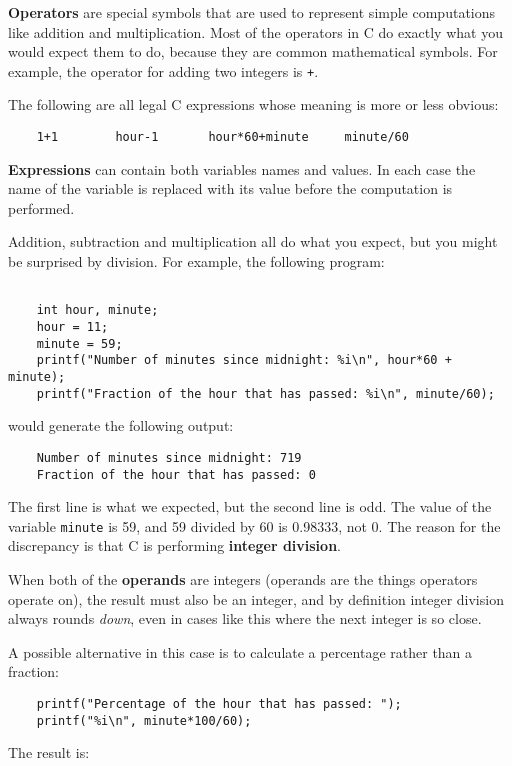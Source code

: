{\bf Operators} are special symbols that are used to represent
simple computations like addition and multiplication.  Most
of the operators in C do exactly what you would expect them
to do, because they are common mathematical symbols.  For
example, the operator for adding two integers is {\tt +}.

The following are all legal C expressions whose meaning is
more or less obvious:

\begin{verbatim}
    1+1        hour-1       hour*60+minute     minute/60
\end{verbatim}
%
{\bf Expressions} can contain both variables
names and values.  In each case the name of the variable is
replaced with its value before the computation is performed.


Addition, subtraction and multiplication all do what you
expect, but you might be surprised by division.  For example,
the following program:

\begin{verbatim}

    int hour, minute;
    hour = 11;
    minute = 59;
    printf("Number of minutes since midnight: %i\n", hour*60 + minute);
    printf("Fraction of the hour that has passed: %i\n", minute/60);

\end{verbatim}
%
would generate the following output:

\begin{verbatim}
    Number of minutes since midnight: 719
    Fraction of the hour that has passed: 0
\end{verbatim}
%
The first line is what we expected, but the second line is
odd.  The value of the variable {\tt minute} is 59, and
59 divided by 60 is 0.98333, not 0.  The reason for the
discrepancy is that C is performing {\bf integer division}.


When both of the {\bf operands} are integers (operands are the things
operators operate on), the result must also be an integer,
and by definition integer division always rounds {\em down},
even in cases like this where the next integer is so close.

A possible alternative in this case is to calculate a percentage
rather than a fraction:

\begin{verbatim}
    printf("Percentage of the hour that has passed: ");
    printf("%i\n", minute*100/60);
\end{verbatim}
%
The result is:

